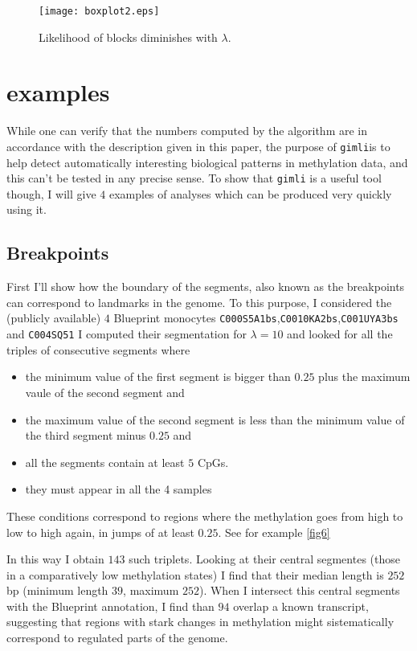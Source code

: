 \documentclass[12pt]{amsart}
\newcommand{\gimli}{\texttt{gimli}}
\begin{document}
\begin{figure}\label{fig5}
\texttt{[image: boxplot2.eps]}
\caption{Likelihood of blocks diminishes with $\lambda$.}
\end{figure}

\section{examples}

While one can verify that the numbers computed by the algorithm are in 
accordance with the description
given in this paper, the purpose of \gimli is to help 
detect automatically interesting
biological patterns in methylation data, and this can't be tested in any 
precise sense. To show that \gimli{} is a useful tool
though, I will give $4$ examples of analyses which can be produced very quickly
using it. 

\subsection{Breakpoints}

First I'll show how the boundary of the segments, also known as the breakpoints
can correspond to landmarks in the genome. To this purpose, I considered the (publicly available)
$4$ Blueprint monocytes \verb=C000S5A1bs=,\verb=C0010KA2bs=,\verb=C001UYA3bs= and \verb=C004SQ51= 
I computed their segmentation for $\lambda=10$ and looked for all the triples of consecutive segments
where 
\begin{itemize}
\item{} the minimum value of the first segment is bigger than $0.25$ plus the maximum vaule
of the second segment and
\item{} the maximum value of the second segment is less than the minimum value of the third
segment minus $0.25$ and
\item{} all the segments contain at least $5$ CpGs.
\item{} they must appear in all the 4 samples
\end{itemize}

These conditions correspond to regions where the methylation goes from high to low to high again,
in jumps of at least $0.25$.
See for example \ref{fig6} 

In this way I obtain $143$ such triplets. Looking at their central segmentes
(those in a comparatively low methylation states) I find that their median length is
$252$bp (minimum length $39$, maximum $252$). When I intersect this central segments with the Blueprint
annotation, I find than $94$ overlap a known transcript, suggesting that regions with stark 
changes in methylation
might sistematically correspond to regulated parts of the genome.
\end{document}
